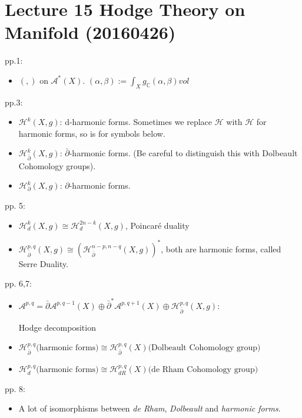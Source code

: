 \section{Lecture 15 Hodge Theory on Manifold (20160426)}
pp.1:
\begin{itemize}
    \item $(,)$ on $\mathcal{A}^*(X)$. $(\alpha,\beta):=\int_X g_\mathbb{C}(\alpha,\beta) vol$
\end{itemize}
pp.3:
\begin{itemize}
    \item $\mathcal{H}^k(X,g)$: d-harmonic forms. Sometimes we replace $\mathcal{H}$ with $\mathscr{H}$ for harmonic forms, so is for symbols below.
    \item $\mathcal{H}^k_{\bar{\partial}}(X,g)$: $\bar{\partial}$-harmonic forms. 
    (Be careful to distinguish this with Dolbeault Cohomology groups).
    \item $\mathcal{H}^k_{\partial}(X,g)$: $\partial$-harmonic forms.
\end{itemize}
pp. 5:
\begin{itemize}
    \item $\mathcal{H}^k_d(X,g) \cong \mathcal{H}^{2n-k}_d(X,g)$, Poincar\'{e} duality
    \item $\mathcal{H}^{p,q}_{\bar{\partial}}(X,g) \cong 
    \left( \mathcal{H}^{n-p,n-q}_{\bar{\partial}}(X,g)\right)^*$, both are harmonic forms, called Serre Duality. 
\end{itemize}
pp. 6,7:
\begin{itemize}
    \item 
    $\mathcal{A}^{p,q} = 
    \bar{\partial}\mathcal{A}^{p,q-1}(X)\oplus
    \bar{\partial}^* \mathcal{A}^{p,q+1}(X) \oplus
    \mathcal{H}^{p,q}_{\bar{\partial}}(X,g)$:
    
     Hodge decomposition

    \item $\mathcal{H}^{p,q}_{\bar{\partial}}
        \text{(harmonic forms)}
        \cong
        \mathcal{H}^{p,q}_{\bar{\partial}}(X)
        \text{(Dolbeault Cohomology group)}$
    \item $\mathcal{H}^{p,q}_{d}
        \text{(harmonic forms)}
        \cong
        \mathcal{H}^{p,q}_{dR}(X)
        \text{(de Rham Cohomology group)}$
\end{itemize}
pp. 8:
\begin{itemize}
    \item A lot of isomorphisms between \textit{de Rham}, \textit{Dolbeault} and \textit{harmonic forms}.
\end{itemize}

